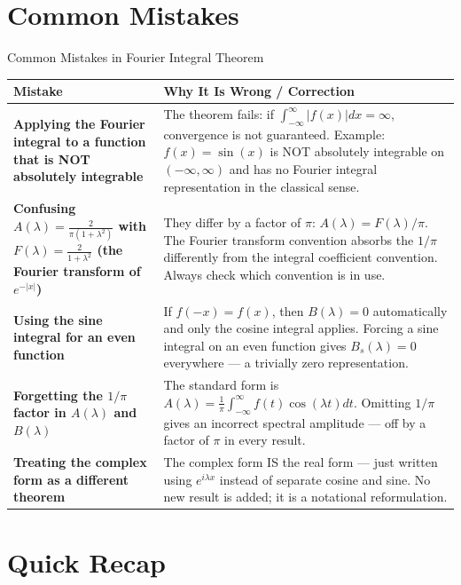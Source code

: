 \documentclass[12pt,a4paper]{article}
\begin{document}
\section{Common Mistakes}

\begin{mistakebox}{Common Mistakes in Fourier Integral Theorem}
\begin{tabular}{>{\bfseries}p{} p{}}
\toprule
\textbf{Mistake} & \textbf{Why It Is Wrong / Correction} \\
\midrule
Applying the Fourier integral to a function that is NOT absolutely integrable & The theorem fails: if $\int_{-\infty}^\infty|f(x)|dx=\infty$, convergence is not guaranteed. Example: $f(x)=\sin(x)$ is NOT absolutely integrable on $(-\infty,\infty)$ and has no Fourier integral representation in the classical sense. \\
\midrule
Confusing $A(\lambda)=\frac{2}{\pi(1+\lambda^2)}$ with $F(\lambda)=\frac{2}{1+\lambda^2}$ (the Fourier transform of $e^{-|x|}$) & They differ by a factor of $\pi$: $A(\lambda)=F(\lambda)/\pi$. The Fourier transform convention absorbs the $1/\pi$ differently from the integral coefficient convention. Always check which convention is in use. \\
\midrule
Using the sine integral for an even function & If $f(-x)=f(x)$, then $B(\lambda)=0$ automatically and only the cosine integral applies. Forcing a sine integral on an even function gives $B_s(\lambda)=0$ everywhere --- a trivially zero representation. \\
\midrule
Forgetting the $1/\pi$ factor in $A(\lambda)$ and $B(\lambda)$ & The standard form is $A(\lambda)=\frac{1}{\pi}\int_{-\infty}^\infty f(t)\cos(\lambda t)dt$. Omitting $1/\pi$ gives an incorrect spectral amplitude --- off by a factor of $\pi$ in every result. \\
\midrule
Treating the complex form as a different theorem & The complex form IS the real form --- just written using $e^{i\lambda x}$ instead of separate cosine and sine. No new result is added; it is a notational reformulation. \\
\bottomrule
\end{tabular}
\end{mistakebox}

\section{Quick Recap}
\end{document}
